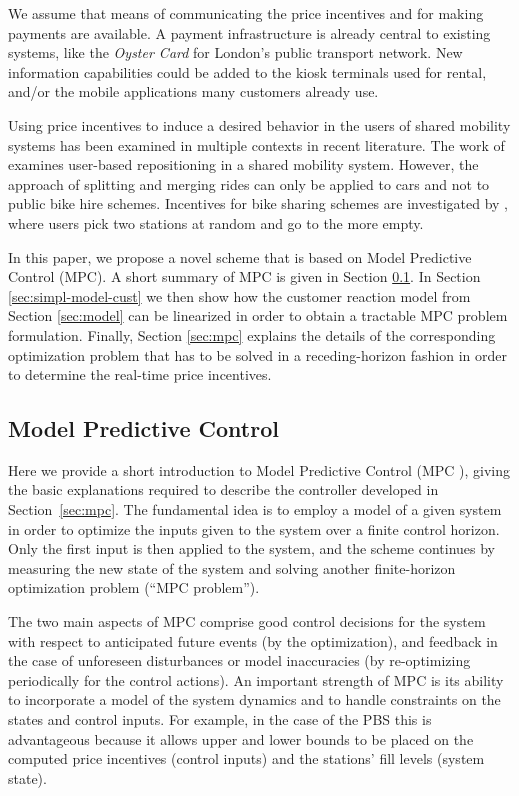 \documentclass{article}
\begin{document}
We assume that means of communicating the price incentives and for making
payments are available. A payment infrastructure is already central to existing
systems, like the \emph{Oyster Card} for London's public transport network. New
information capabilities could be added to the kiosk terminals used for rental,
and/or the mobile applications many customers already use.

Using price incentives to induce a desired behavior in the users of shared
mobility systems has been examined in multiple contexts in recent literature.
The work of \cite{barth2004} examines user-based repositioning in a shared
mobility system. However, the approach of splitting and merging rides can only
be applied to cars and not to public bike hire schemes. Incentives for bike
sharing schemes are investigated by \cite{fricker_incentives_2012}, where users
pick two stations at random and go to the more empty.

In this paper, we propose a novel scheme that is based on Model Predictive
Control (MPC). A short summary of MPC is given in Section
\ref{sec:model-pred-contr}. In Section \ref{sec:simpl-model-cust} we then
show how the customer reaction model from Section \ref{sec:model} can be
linearized in order to obtain a tractable MPC problem formulation. Finally,
Section \ref{sec:mpc} explains the details of the corresponding
optimization problem that has to be solved in a
receding-horizon fashion in order to determine the real-time price incentives.

\subsection{Model Predictive Control}\label{sec:model-pred-contr}
Here we provide a short introduction to Model Predictive Control (MPC \cite{maciejowski2002}), giving
the basic explanations required to describe the controller developed
in Section~\ref{sec:mpc}. The fundamental idea is to employ a model of a given system in
order to optimize the inputs given to the system over a finite control horizon.
Only the first input is then applied to the system, and the scheme continues by
measuring the new state of the system and solving another finite-horizon
optimization problem (``MPC problem'').

The two main aspects of MPC comprise good control decisions for the system with
respect to anticipated future events (by the optimization), and feedback in the
case of unforeseen disturbances or model inaccuracies (by re-optimizing
periodically for the control actions). An important strength of MPC is its
ability to incorporate a model of the system dynamics and to handle constraints
on the states and control inputs. For example, in the case of the PBS this is
advantageous because it allows upper and lower bounds to be placed on the computed
price incentives (control inputs) and the stations' fill levels (system state).
\end{document}
